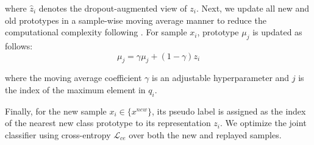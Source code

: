 \documentclass[11pt]{article}
\begin{document}
where $\hat{z}_i$ denotes the dropout-augmented view of $z_i$.
Next, we update all new and old prototypes in a sample-wise moving average manner to reduce the computational complexity following \cite{wang2022pico}. For sample $x_i$, prototype $\mu_j$ is updated as follows:
\begin{equation}
    \mu_j=\gamma \mu_j+(1-\gamma)z_i
\end{equation}

where the moving average coefficient $\gamma$ is an adjustable hyperparameter and $j$ is the index of the maximum element in $q_i$. %

Finally, for the new sample ${x_i} \in \{x^{new}\}$, its pseudo label is assigned as the index of the nearest new class prototype to its representation $z_i$.
We optimize the joint classifier using cross-entropy $\mathcal{L}_{ce}$ over both the new and replayed samples.

\begin{table}[t]
\centering
\caption{The number of new classes at each stage.}
\label{tab:ind_ood_spit}
\end{table}
\end{document}
